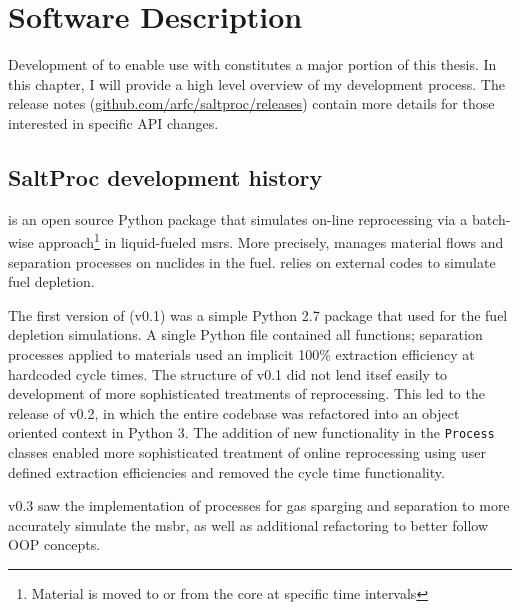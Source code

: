 \chapter{Software Description}
Development of \SaltProc to enable use with \OpenMC constitutes a major portion
of this thesis. In this chapter, I will provide a high level overview
of my development process. The release
notes (\url{github.com/arfc/saltproc/releases}) contain more
details for those interested in specific API changes. 

\section{SaltProc development history}%
\label{sec:saltproc-history}

\SaltProc\cite{rykhlevskii_saltproc_2018} is an open source Python package that
simulates on-line reprocessing via a batch-wise approach\footnote{Material is
moved to or from the core at specific time intervals} in liquid-fueled
\Gls{msr}s. More precisely, \SaltProc manages material flows and separation
processes on nuclides in the fuel. \SaltProc relies on external codes to simulate
fuel depletion.

The first version of \SaltProc (v0.1) was a simple Python 2.7 package that used
\SerpentTWO for the fuel depletion simulations. A single Python file contained
all functions; separation processes applied to materials used an implicit 100\%
extraction efficiency at hardcoded cycle times\cite{rykhlevskii_advanced_2018}.
The structure of \SaltProc v0.1 did not lend itsef easily to development of more
sophisticated treatments of reprocessing. This led to the release of \SaltProc
v0.2, in which the entire codebase was refactored into an object oriented
context in Python 3. The addition of new functionality in the \verb.Process.
classes enabled more sophisticated treatment of online reprocessing using user
defined extraction efficiencies and removed the cycle time functionality\cite{rykhlevskii_fuel_2020}.

\SaltProc v0.3 saw the implementation of processes for gas sparging and
separation to more accurately simulate the \gls{msbr}, as well as additional
refactoring to better follow OOP concepts.

